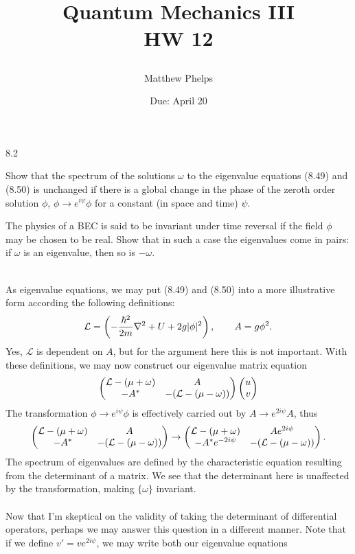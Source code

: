 \documentclass[10pt,letterpaper]{article}
\title{\begin{spacing}{1.2}Quantum Mechanics III\\HW 12\end{spacing}}
\author{Matthew Phelps}
\date{Due: April 20}
\begin{document}
\maketitle

\benum
\item[8.2]
\benum
\item
Show that the spectrum of the solutions $\omega$ to the eigenvalue equations (8.49) and (8.50) is unchanged
if there is a global change in the phase of the zeroth order solution $\phi$, $\phi\to e^{i\psi}\phi$ for
a constant (in space and time) $\psi$. \\
\item
The physics of a BEC is said to be invariant under time reversal if the field $\phi$ may be chosen to be real. Show
that in such a case the eigenvalues come in pairs: if $\omega$ is an eigenvalue, then so is $-\omega$.\\ \\
\eenum
\benum
\item %
As eigenvalue equations, we may put (8.49) and (8.50) into a more illustrative form according the following definitions:
\[
 	\mathcal L = \left( -\frac{\hbar^2}{2m}\nabla^2 +U+2g|\phi|^2\right),\qquad
	A = g\phi^2.
\]
Yes, $\mathcal L$ is dependent on $A$, but for the argument here this is not important. With these definitions,
we may now construct our eigenvalue matrix equation
\[
	\begin{pmatrix} \mathcal L - (\mu+\omega)& A \\ -A^*&-(\mathcal L-(\mu-\omega)) \end{pmatrix}\begin{pmatrix} u\\ v\end{pmatrix} 
\]
The transformation $\phi \to e^{i\psi}\phi$ is effectively carried out by $A\to e^{2i\psi}A$, thus
\[
	\begin{pmatrix} \mathcal L - (\mu+\omega)& A \\ -A^*&-(\mathcal L-(\mu-\omega)) \end{pmatrix} \to
	\begin{pmatrix} \mathcal L - (\mu+\omega)& Ae^{2i\psi} \\ -A^*e^{-2i\psi}&-(\mathcal L-(\mu-\omega)) \end{pmatrix}.
\]
The spectrum of eigenvalues are defined by the characteristic equation resulting from the determinant of a matrix.
We see that the determinant here is unaffected by the transformation, making $\{\omega\}$ invariant.
\\ \\ Now that I'm skeptical on the validity of taking the determinant of differential operators, perhaps we may answer this
question in a different manner. Note that if we define $v' =  ve^{2i\psi}$, we may write both our eigenvalue equations 
\end{document}
